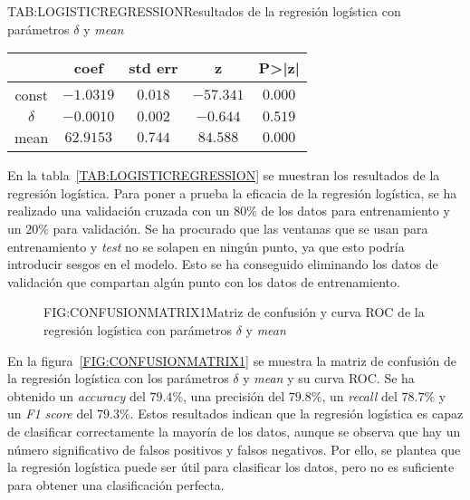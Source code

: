 \begin{table}[Resultados de la regresión logística con parámetros $\delta$ y \textit{mean}]{TAB:LOGISTICREGRESSION}{Resultados de la regresión logística con parámetros $\delta$ y \textit{mean}}
    \begin{tabular}{|c|c|c|c|c|}
        \hline
        & coef & std err & z & P>|z| \\
        \hline
        const & $-1.0319$ & $0.018$ & $-57.341$ & $0.000$ \\
        $\delta$ & $-0.0010$ & $0.002$ & $-0.644$ & $0.519$ \\
        mean & $62.9153$ & $0.744$ & $84.588$ & $0.000$ \\
        \hline
    \end{tabular}
\end{table}

En la tabla~\ref{TAB:LOGISTICREGRESSION} se muestran los resultados de la regresión logística. Para poner a prueba la eficacia de la regresión logística, se ha realizado una validación cruzada con un $80\%$ de los datos para entrenamiento y un $20\%$ para validación. Se ha procurado que las ventanas que se usan para entrenamiento y \textit{test} no se solapen en ningún punto, ya que esto podría introducir sesgos en el modelo. Esto se ha conseguido eliminando los datos de validación que compartan algún punto con los datos de entrenamiento. 

\begin{figure}[Matriz de confusión y curva ROC de la regresión logística con parámetros $\delta$ y \textit{mean}]{FIG:CONFUSIONMATRIX1}{Matriz de confusión y curva ROC de la regresión logística con parámetros $\delta$ y \textit{mean}}
     \quad
\end{figure}


En la figura~\ref{FIG:CONFUSIONMATRIX1} se muestra la matriz de confusión de la regresión logística con los parámetros $\delta$ y \textit{mean} y su curva \ac{ROC}.
Se ha obtenido un \textit{accuracy} del $79.4\%$, una precisión del $79.8\%$, un \textit{recall} del $78.7\%$ y un \textit{F1 score} del $79.3\%$. Estos resultados indican que la regresión logística es capaz de clasificar correctamente la mayoría de los datos, aunque se observa que hay un número significativo de falsos positivos y falsos negativos. Por ello, se plantea que la regresión logística puede ser útil para clasificar los datos, pero no es suficiente para obtener una clasificación perfecta.

